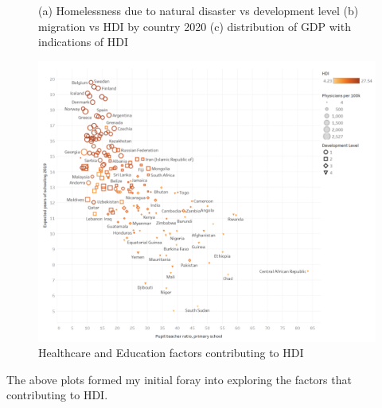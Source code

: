 \documentclass[ 10pt ]{fphw}
\begin{document}
\begin{figure}
\begin{minipage}[b][\ht\measurebox][s]{.55\textwidth}
\vfill
{}
\end{minipage}
\caption{(a) Homelessness due to natural disaster vs development level (b) migration vs HDI by country 2020 (c) distribution of GDP with indications of HDI}
\label{fig:quafdPLOT}
\end{figure}

\clearpage

\begin{center}
\begin{figure}
    \centering
    \label{fig1:healthED}
	\includegraphics[width=0.75\columnwidth]{healthEducation.png} 
	\caption{Healthcare and Education factors contributing to HDI}
	\end{figure}
\end{center}

The above plots formed my initial foray into exploring the factors that contributing to HDI.

\vspace{0.3cm}
\end{document}
